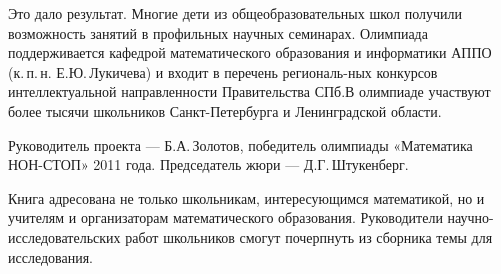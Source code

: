 \ms\abz Это дало результат. Многие дети из общеобразовательных школ получили возможность занятий в профильных научных семинарах. Олимпиада поддерживается кафедрой математического образования и информатики АППО (к.\,п.\,н. Е.Ю.\,Лукичева) и входит в перечень региональ-\linebreak ных конкурсов интеллектуальной направленности Правительства СПб.\linebreak В олимпиаде участвуют более тысячи школьников Санкт-Петербурга и Ленинградской области.

\ms\abz Руководитель проекта — Б.А.\,Золотов, победитель олимпиады «Математика НОН-СТОП» 2011 года. Председатель жюри — Д.Г.\,Штукенберг.   

\ms\abz Книга адресована не только школьникам, интересующимся математикой, но и учителям и организаторам математического образования. Руководители научно-исследовательских работ школьников смогут почерпнуть из сборника темы для исследования.